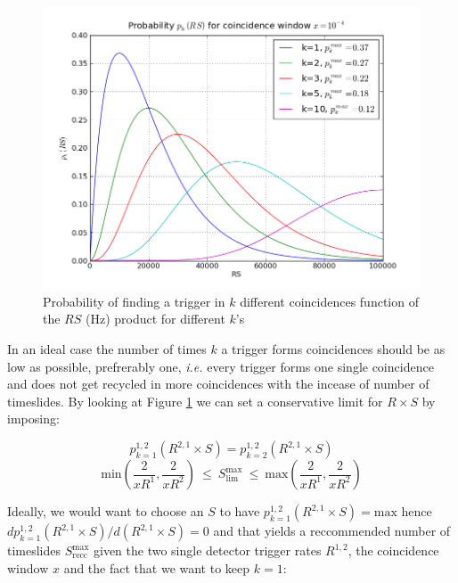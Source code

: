 \documentclass[epsf]{article}
\begin{document}
\begin{figure}[ht!]
\centering
\includegraphics[scale=0.50]{pk_of_RS.png}
\caption{Probability of finding a trigger in $k$ different coincidences function of the $RS$ (Hz) product for different $k$'s}
\label{poissonks}
\end{figure}

In an ideal case the number of times $k$ a trigger forms coincidences should be as low as possible, prefrerably one, \emph{i.e.} every trigger forms one single coincidence and does not get recycled in more coincidences with the incease of number of timeslides. By looking at Figure \ref{poissonks} we can set a conservative limit for $R \times S$ by imposing:

\begin{equation}
p^{1,2}_{k=1}(R^{2,1} \times S) = p^{1,2}_{k=2}(R^{2,1} \times S)
\end{equation}
\begin{equation}
\mathrm{min}(\frac {2}{xR^1}, \frac {2}{xR^2}) ~\leq~ S^{\mathrm{max}}_{\mathrm{lim}} ~\leq~ \mathrm{max}(\frac {2}{xR^1}, \frac {2}{xR^2})
\end{equation}

Ideally, we would want to choose an $S$ to have $p^{1,2}_{k=1}(R^{2,1} \times S) = \mathrm{max}$ hence $dp^{1,2}_{k=1}(R^{2,1} \times S)/d(R^{2,1} \times S)=0$ and that yields a reccommended number of timeslides $S^{\mathrm{max}}_{\mathrm{recc}}$ given the two single detector trigger rates $R^{1,2}$, the coincidence window $x$ and the fact that we want to keep $k=1$:
\end{document}
